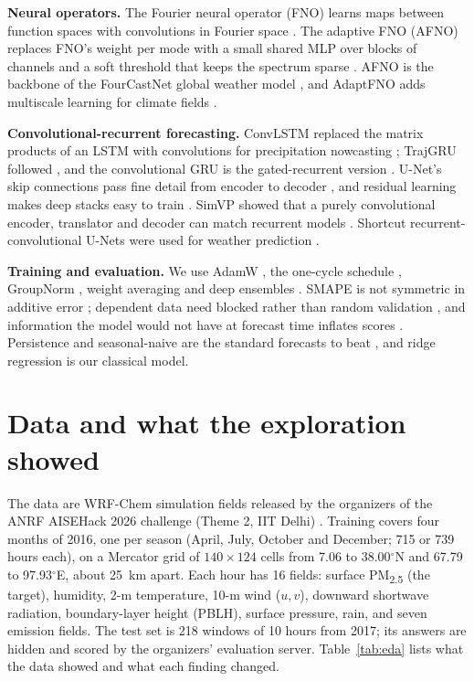 \documentclass[conference]{IEEEtran}
\newcommand{\PM}{PM\textsubscript{2.5}}
\begin{document}
\textbf{Neural operators.} The Fourier neural operator (FNO) learns maps between function spaces with convolutions in Fourier space \cite{li2021fno}. The adaptive FNO (AFNO) replaces FNO's weight per mode with a small shared MLP over blocks of channels and a soft threshold that keeps the spectrum sparse \cite{guibas2022afno}. AFNO is the backbone of the FourCastNet global weather model \cite{pathak2022fourcastnet}, and AdaptFNO adds multiscale learning for climate fields \cite{dang2025adaptfno}.

\textbf{Convolutional-recurrent forecasting.} ConvLSTM replaced the matrix products of an LSTM with convolutions for precipitation nowcasting \cite{shi2015convlstm}; TrajGRU followed \cite{shi2017trajgru}, and the convolutional GRU is the gated-recurrent version \cite{ballas2016convgru}. U-Net's skip connections pass fine detail from encoder to decoder \cite{ronneberger2015unet}, and residual learning makes deep stacks easy to train \cite{he2016}. SimVP showed that a purely convolutional encoder, translator and decoder can match recurrent models \cite{gao2022simvp}. Shortcut recurrent-convolutional U-Nets were used for weather prediction \cite{leinonen2021}.

\textbf{Training and evaluation.} We use AdamW \cite{loshchilov2019}, the one-cycle schedule \cite{smith2019}, GroupNorm \cite{wu2018}, weight averaging \cite{polyak1992} and deep ensembles \cite{lakshminarayanan2017}. SMAPE is not symmetric in additive error \cite{goodwin1999}; dependent data need blocked rather than random validation \cite{roberts2017}, and information the model would not have at forecast time inflates scores \cite{kaufman2012}. Persistence and seasonal-naive are the standard forecasts to beat \cite{hyndman2021}, and ridge regression \cite{hoerl1970} is our classical model.

\section{Data and what the exploration showed}
\label{sec:data}
The data are WRF-Chem simulation fields released by the organizers of the ANRF AISEHack 2026 challenge (Theme 2, IIT Delhi) \cite{aisehack2026}. Training covers four months of 2016, one per season (April, July, October and December; 715 or 739 hours each), on a Mercator grid of $140\times124$ cells from 7.06 to 38.00$^\circ$N and 67.79 to 97.93$^\circ$E, about 25~km apart. Each hour has 16 fields: surface \PM{} (the target), humidity, 2-m temperature, 10-m wind ($u,v$), downward shortwave radiation, boundary-layer height (PBLH), surface pressure, rain, and seven emission fields. The test set is 218 windows of 10 hours from 2017; its answers are hidden and scored by the organizers' evaluation server. Table~\ref{tab:eda} lists what the data showed and what each finding changed.
\end{document}
